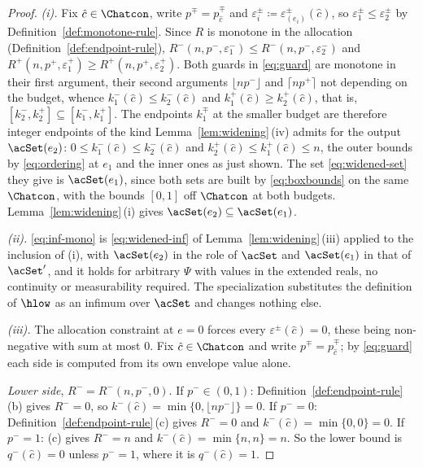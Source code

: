 \begin{proof}
\emph{(i).} Fix $\hat c\in\Chatcon$, write $p^{\mp}=p^{\mp}_{\hat c}$ and
$\varepsilon^{\pm}_i\coloneqq\varepsilon^{\pm}_{(e_i)}(\hat c)$, so
$\varepsilon^{\pm}_1\le\varepsilon^{\pm}_2$ by
Definition~\ref{def:monotone-rule}. Since $R$ is monotone in the allocation
(Definition~\ref{def:endpoint-rule}),
$R^{-}(n,p^{-},\varepsilon^{-}_1)\le R^{-}(n,p^{-},\varepsilon^{-}_2)$ and
$R^{+}(n,p^{+},\varepsilon^{+}_1)\ge R^{+}(n,p^{+},\varepsilon^{+}_2)$. Both
guards in \eqref{eq:guard} are monotone in their first argument, their second
arguments $\lfloor np^{-}\rfloor$ and $\lceil np^{+}\rceil$ not depending on
the budget, whence $k^{-}_1(\hat c)\le k^{-}_2(\hat c)$ and
$k^{+}_1(\hat c)\ge k^{+}_2(\hat c)$,
that is, $[k^{-}_2,k^{+}_2]\subseteq[k^{-}_1,k^{+}_1]$. The endpoints
$k^{\mp}_1$ at the smaller budget are therefore integer endpoints of the kind
Lemma~\ref{lem:widening}\,(iv) admits for the output $\acSet(e_2)$:
$0\le k^{-}_1(\hat c)\le k^{-}_2(\hat c)$ and
$k^{+}_2(\hat c)\le k^{+}_1(\hat c)\le n$, the outer bounds by
\eqref{eq:ordering} at $e_1$ and the inner ones as just shown. The set
\eqref{eq:widened-set} they give is $\acSet(e_1)$, since both sets are built
by \eqref{eq:boxbounds} on the same $\Chatcon$, with the bounds $[0,1]$ off
$\Chatcon$ at both budgets. Lemma~\ref{lem:widening}\,(i) gives
$\acSet(e_2)\subseteq\acSet(e_1)$.

\emph{(ii).} \eqref{eq:inf-mono} is \eqref{eq:widened-inf} of
Lemma~\ref{lem:widening}\,(iii) applied to the inclusion of (i), with
$\acSet(e_2)$ in the role of $\acSet$ and $\acSet(e_1)$ in that of $\acSet'$,
and it holds
for arbitrary $\Psi$ with values in the extended reals, no continuity or
measurability required. The specialization substitutes the definition of
$\hlow$ as an infimum over $\acSet$ and changes nothing else.

\emph{(iii).} The allocation constraint at $e=0$ forces every
$\varepsilon^{\pm}(\hat c)=0$, these being non-negative with sum at most $0$.
Fix $\hat c\in\Chatcon$ and write $p^{\mp}=p^{\mp}_{\hat c}$; by
\eqref{eq:guard} each side is computed from its own envelope value alone.

\emph{Lower side}, $R^{-}=R^{-}(n,p^{-},0)$. If $p^{-}\in(0,1)$:
Definition~\ref{def:endpoint-rule}\,(b) gives $R^{-}=0$, so
$k^{-}(\hat c)=\min\{0,\lfloor np^{-}\rfloor\}=0$. If $p^{-}=0$:
Definition~\ref{def:endpoint-rule}\,(c) gives $R^{-}=0$ and
$k^{-}(\hat c)=\min\{0,0\}=0$. If $p^{-}=1$: (c) gives $R^{-}=n$ and
$k^{-}(\hat c)=\min\{n,n\}=n$. So the lower bound is $q^{-}(\hat c)=0$ unless
$p^{-}=1$, where it is $q^{-}(\hat c)=1$.


\end{proof}
